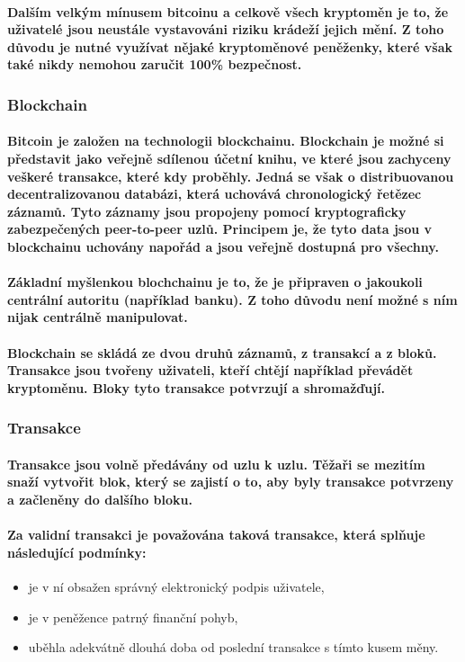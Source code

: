 \documentclass[thesis=B,czech]{FITthesis}[2019/03/21]
\begin{document}
\paragraph{
Dalším velkým mínusem bitcoinu a celkově všech kryptoměn je to, že uživatelé jsou neustále vystavováni riziku krádeží jejich mění. Z toho důvodu je nutné využívat nějaké kryptoměnové peněženky, které však také nikdy nemohou zaručit 100\% bezpečnost.\cite{Finex}
}
\subsubsection{Blockchain}
\paragraph{
Bitcoin je založen na technologii blockchainu. Blockchain je možné si představit jako veřejně sdílenou účetní knihu, ve které jsou zachyceny veškeré transakce, které kdy proběhly. Jedná se však o distribuovanou decentralizovanou databázi, která uchovává chronologický řetězec záznamů. Tyto záznamy jsou propojeny pomocí kryptograficky zabezpečených peer-to-peer uzlů. Principem je, že tyto data jsou v blockchainu uchovány napořád a jsou veřejně dostupná pro všechny. \cite{Bitcoin_how_it_works}
}
\paragraph{
Základní myšlenkou blochchainu je to, že je připraven o jakoukoli centrální autoritu (například banku). Z toho důvodu není možné s ním nijak centrálně manipulovat.
}
\paragraph{
Blockchain se skládá ze dvou druhů záznamů, z transakcí a z bloků. Transakce jsou tvořeny uživateli, kteří chtějí například převádět kryptoměnu. Bloky tyto transakce potvrzují a shromažďují. \cite{Finex_blockchain}
}
\subsubsection{Transakce}
\paragraph{
Transakce jsou volně předávány od uzlu k uzlu. Těžaři se mezitím snaží vytvořit blok, který se zajistí o to, aby byly transakce potvrzeny a začleněny do dalšího bloku.
}
\paragraph{
Za validní transakci je považována taková transakce, která splňuje následující podmínky:
}
\begin{itemize}
    \item je v ní obsažen správný elektronický podpis uživatele,
    \item je v peněžence patrný finanční pohyb,
    \item uběhla adekvátně dlouhá doba od poslední transakce s tímto kusem měny. \cite{Finex_blockchain}
\end{itemize}
\end{document}
